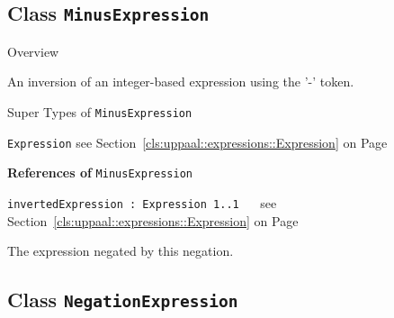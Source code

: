 	

\subsection{Class \bfseries \texttt{MinusExpression}\normalfont}
\label{cls:uppaal::expressions::MinusExpression} 
	
	\begin{longdescription}
		\item[Overview] 		
				

	

		An inversion of an integer-based expression using the '-' token.		
		\item[Super Types of \texttt{MinusExpression}] ~
			\begin{longdescription}
				\item[\texttt{Expression}] see Section~\ref{cls:uppaal::expressions::Expression} on Page~\pageref{cls:uppaal::expressions::Expression}						\end{longdescription}
		
	
			\item[\textbf{References of} \texttt{MinusExpression}] ~
			\begin{longdescription}
	\item[\texttt{invertedExpression : Expression 	\symbol{"5B}1..1\symbol{"5D}
}] ~
	see Section~\ref{cls:uppaal::expressions::Expression} on Page~\pageref{cls:uppaal::expressions::Expression}
	
	\nopagebreak
		
				

	

		The expression negated by this negation.		
			\end{longdescription}
	
	\end{longdescription}
	

\subsection{Class \bfseries \texttt{NegationExpression}\normalfont}
\label{cls:uppaal::expressions::NegationExpression} 
	
